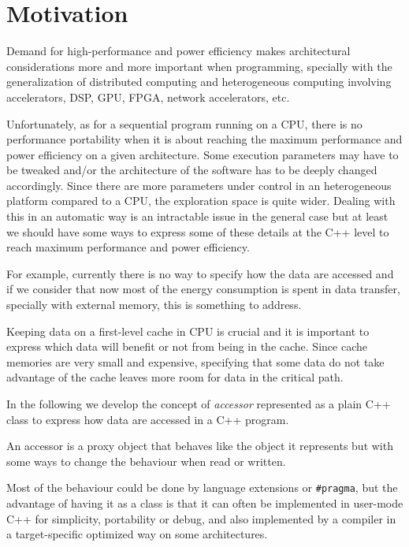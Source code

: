 \documentclass[a4paper]{article}
\begin{document}
\clearpage

\tableofcontents


\section{Motivation}
\label{sec:motivation}

Demand for high-performance and power efficiency makes architectural
considerations more and more important when programming, specially with
the generalization of distributed computing and heterogeneous
computing involving accelerators, DSP, GPU, FPGA, network
accelerators, etc.

Unfortunately, as for a sequential program running on a CPU, there is
no performance portability when it is about reaching the maximum
performance and power efficiency on a given architecture. Some
execution parameters may have to be tweaked and/or the architecture of the
software has to be deeply changed accordingly. Since there are more
parameters under control in an heterogeneous platform compared to a
CPU, the exploration space is quite wider. Dealing with
this in an automatic way is an intractable issue in the general case but
at least we should have some ways to express some of these details at
the C++ level to reach maximum performance and power efficiency.

For example, currently there is no way to specify how the data are
accessed and if we consider that now most of the energy consumption is
spent in data transfer, specially with external memory, this is
something to address.

Keeping data on a first-level cache in CPU is crucial and it is
important to express which data will benefit or not from being in the
cache. Since cache memories are very small and expensive, specifying
that some data do not take advantage of the cache leaves more room for
data in the critical path.

In the following we develop the concept of \emph{accessor} represented
as a plain C++ class to express how data are accessed in a C++
program.

An accessor is a proxy object that behaves like the object it
represents but with some ways to change the behaviour when read or
written.

Most of the behaviour could be done by language extensions or
\lstinline|#pragma|, but the advantage of having it as a class is that
it can often be implemented in user-mode C++ for simplicity,
portability or debug, and also implemented by a compiler in a
target-specific optimized way on some architectures.
\end{document}
